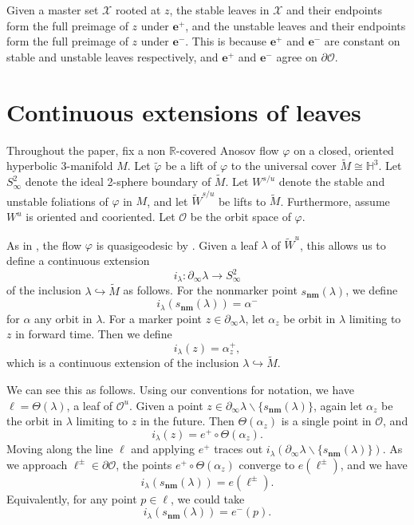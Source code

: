 \documentclass[11pt]{amsart}
\newcommand{\HH}[0]{\mathbb{H}}
\newcommand{\R}{\mathbb{R}}
\renewcommand{\l}{\lambda}
\newcommand{\wt}{\widetilde}
\newcommand{\mc}{\mathcal}
\newcommand{\orb}{\mathcal{O}}
\newcommand\ssm{\smallsetminus}
\newcommand{\eplus}{\mathbf{e}^+}
\newcommand{\emin}{\mathbf{e}^-}
\newcommand{\snm}{s_\mathbf{nm}}
\numberwithin{equation}{section}
\theoremstyle{definition}
\begin{document}
Given a master set $\mc X$ rooted at $z$, the stable leaves in $\mc X$ and their endpoints form the full preimage of $z$ under $\eplus$, and the unstable leaves and their endpoints form the full preimage of $z$ under $\emin$. This is because $\eplus$ and $\emin$ are constant on stable and unstable leaves respectively, and $\eplus$ and $\emin$ agree on $\partial\orb$.


\section{Continuous extensions of leaves}\label{sec:i}

Throughout the paper, fix a non $\R$-covered Anosov flow $\varphi$ on a closed, oriented hyperbolic 3-manifold $M$. Let $\wt \varphi$ be a lift of $\varphi$ to the universal cover $\wt M\cong\HH^3$. Let $S^2_\infty$ denote the ideal 2-sphere boundary of $\wt M$. Let $W^{s/u}$ denote the stable and unstable foliations of $\varphi$ in $M$, and let $\wt W^{s/u}$ be lifts to $\wt M$. Furthermore, assume $W^u$ is oriented and cooriented. Let $\orb$ be the orbit space of $\varphi$. 



As in , the flow $\varphi$ is quasigeodesic by \cite{fenley2022nonrcoveredanosovflows}. Given a leaf $\l$ of $\wt W^u$, this allows us to define a continuous extension 
\[
i_\l\colon\partial_\infty\l\to S^2_\infty
\]
of the inclusion $\l\hookrightarrow \wt M$ as follows. For the nonmarker point $\snm(\l)$, we define
\[
i_\l(\snm(\l))=\alpha^-
\]
for $\alpha$ any orbit in $\l$. For a marker point $z\in\partial_\infty\l$, let $\alpha_z$ be orbit in $\l$ limiting to $z$ in forward time. Then we define
\[
i_\l(z)=\alpha_z^+,
\]
which is a continuous extension of the inclusion $\l\hookrightarrow \wt M$. 


We can see this as follows. Using our conventions for notation, we have $\ell=\Theta(\l)$, a leaf of $\orb^u$. Given a point $z\in\partial_\infty\l\ssm\{\snm(\l)\}$, again let $\alpha_z$ be the orbit in $\l$ limiting to $z$ in the future. Then $\Theta(\alpha_z)$ is a single point in $\orb$, and 
\[
i_\l(z)=e^+\circ\Theta(\alpha_z).
\]
Moving along the line $\ell$ and applying $e^+$ traces out $i_\l(\partial_\infty\l\ssm\{\snm(\l)\})$. As we approach $\ell^\pm\in\partial\orb$, the points $e^+\circ\Theta(\alpha_z)$ converge to $e(\ell^\pm)$, and we have 
\[
i_\l(\snm(\l))=e(\ell^\pm).
\]
Equivalently, for any point $p\in\ell$, we could take
\[
i_\l(\snm(\l))=e^-(p).
\]
\end{document}
